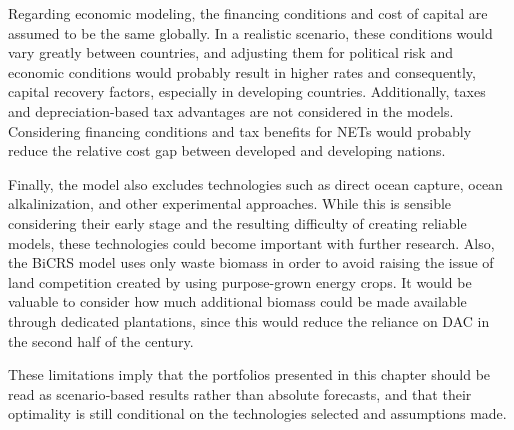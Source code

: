 Regarding economic modeling, the financing conditions and cost of capital are assumed to be the same globally. In a realistic scenario, these conditions would vary greatly between countries, and adjusting them for political risk and economic conditions would probably result in higher rates and consequently, capital recovery factors, especially in developing countries. Additionally, taxes and depreciation-based tax advantages are not considered in the models. Considering financing conditions and tax benefits for NETs would probably reduce the relative cost gap between developed and developing nations.\vspace{2mm}

Finally, the model also excludes technologies such as direct ocean capture, ocean alkalinization, and other experimental approaches. While this is sensible considering their early stage and the resulting difficulty of creating reliable models, these technologies could become important with further research. Also, the BiCRS model uses only waste biomass in order to avoid raising the issue of land competition created by using purpose-grown energy crops. It would be valuable to consider how much additional biomass could be made available through dedicated plantations, since this would reduce the reliance on DAC in the second half of the century.\vspace{2mm}

These limitations imply that the portfolios presented in this chapter should be read as scenario‑based results rather than absolute forecasts, and that their optimality is still conditional on the technologies selected and assumptions made.
